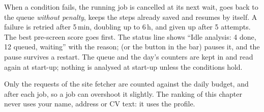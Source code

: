 \vspace{3pt}
When a condition fails, the running job is cancelled at its next wait, goes back to the queue \emph{without
penalty}, keeps the steps already saved and resumes by itself. A failure is retried after 5\,min, doubling up to 6\,h,
and given up after 5 attempts. The best pre-screen score goes first. The status line shows ``Idle analysis: 4
done, 12 queued, waiting'' with the reason;  (or the button in the bar)
pauses it, and the pause survives a restart. The queue and the day's counters are kept in 
and read again at start-up; nothing is analysed at start-up unless the conditions hold.

\begin{infobox}
Only the requests of the site fetcher are counted against the daily budget, and after each job, so a job can
overshoot it slightly. The ranking of this chapter never uses your name, address or CV text: it uses the profile.
\end{infobox}
